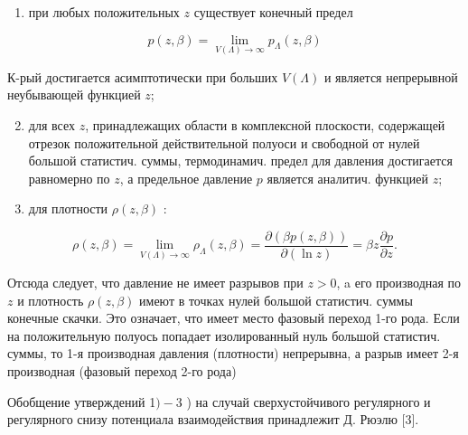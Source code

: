 \documentclass[10pt]{article}
\begin{document}
\begin{enumerate}

  \item при любых положительных $z$ существует конечный предел

\end{enumerate}



\[

p(z, \beta)=\lim _{V(\Lambda) \rightarrow \infty} p_{\Lambda}(z, \beta)

\]



К-рый достигается асимптотически при больших $V(\Lambda)$ и является непрерывной неубывающей функцией $z$;



\begin{enumerate}

  \setcounter{enumi}{1}

  \item для всех $z$, принадлежащих области в комплексной плоскости, содержащей отрезок положительной действительной полуоси и свободной от нулей большой статистич. суммы, термодинамич. предел для давления достигается равномерно по $z$, а предельное давление $p$ является аналитич. функцией $z$;



  \item для плотности $\rho(z, \beta)$ :



\end{enumerate}



\[

\rho(z, \beta)=\lim _{V(\Lambda) \rightarrow \infty} \rho_{\Lambda}(z, \beta)=\frac{\partial(\beta p(z, \beta))}{\partial(\ln z)}=\beta z \frac{\partial p}{\partial z} .

\]



Отсюда следует, что давление не имеет разрывов при $z>0$, a его производная по $z$ и плотность $\rho(z, \beta)$ имеют в точках нулей большой статистич. суммы конечные скачки. Это означает, что имеет место фазовый переход 1-го рода. Если на положительную полуось попадает изолированный нуль большой статистич. суммы, то 1-я производная давления (плотности) непрерывна, а разрыв имеет 2-я производная (фазовый переход 2-го рода)



Обобщение утверждений 1$)-3$ ) на случай сверхустойчивого регулярного и регулярного снизу потенциала взаимодействия принадлежит Д. Рюэлю [3].
\end{document}

